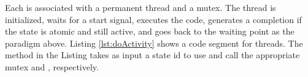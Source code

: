 Each  is associated with a permanent thread and a mutex. The  thread is initialized, waits for a start signal, executes the  code, generates a completion if the state is atomic and still active, and goes back to the waiting point as the paradigm above. Listing \ref{lst:doActivity} shows a code segment for  threads. The method in the Listing takes as input a state id to use and call the appropriate mutex and , respectively. 

